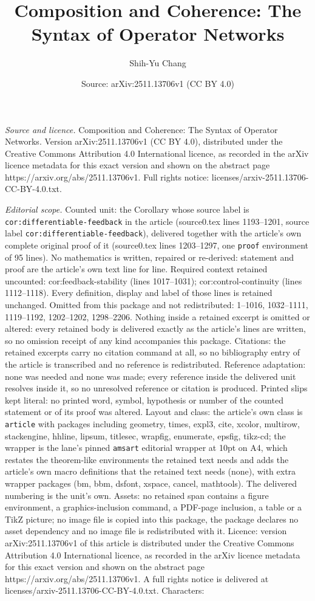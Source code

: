 \documentclass[10pt,a4paper]{amsart}
\title[Composition and Coherence: The Syntax of Operator Networks]{Composition and Coherence: The Syntax of Operator Networks}
\author{Shih-Yu Chang}
\date{Source: arXiv:2511.13706v1 (CC BY 4.0)}
\begin{document}
\maketitle

\noindent\emph{Source and licence.} Composition and Coherence: The Syntax of Operator Networks. Version arXiv:2511.13706v1 (CC BY 4.0), distributed under the Creative Commons Attribution 4.0 International licence, as recorded in the arXiv licence metadata for this exact version and shown on the abstract page https://arxiv.org/abs/2511.13706v1. Full rights notice: licenses/arxiv-2511.13706-CC-BY-4.0.txt.\par\smallskip

\noindent\textit{Editorial scope.} Counted unit: the Corollary whose source label is \texttt{cor:differentiable-feedback} in the article (source0.tex lines 1193--1201, source label \texttt{cor:differentiable-feedback}), delivered together with the article's own complete original proof of it (source0.tex lines 1203--1297, one \texttt{proof} environment of 95 lines). No mathematics is written, repaired or re-derived: statement and proof are the article's own text line for line. Required context retained uncounted: cor:feedback-stability (lines 1017--1031); cor:control-continuity (lines 1112--1118). Every definition, display and label of those lines is retained unchanged. Omitted from this package and not redistributed: 1--1016, 1032--1111, 1119--1192, 1202--1202, 1298--2206. Nothing inside a retained excerpt is omitted or altered: every retained body is delivered exactly as the article's lines are written, so no omission receipt of any kind accompanies this package. Citations: the retained excerpts carry no citation command at all, so no bibliography entry of the article is transcribed and no reference is redistributed. Reference adaptation: none was needed and none was made; every reference inside the delivered unit resolves inside it, so no unresolved reference or citation is produced. Printed slips kept literal: no printed word, symbol, hypothesis or number of the counted statement or of its proof was altered. Layout and class: the article's own class is \texttt{article} with packages including geometry, times, expl3, cite, xcolor, multirow, stackengine, hhline, lipsum, titlesec, wrapfig, enumerate, epsfig, tikz-cd; the wrapper is the lane's pinned \texttt{amsart} editorial wrapper at 10pt on A4, which restates the theorem-like environments the retained text needs and adds the article's own macro definitions that the retained text needs (none), with extra wrapper packages (bm, bbm, dsfont, xspace, cancel, mathtools). The delivered numbering is the unit's own. Assets: no retained span contains a figure environment, a graphics-inclusion command, a PDF-page inclusion, a table or a TikZ picture; no image file is copied into this package, the package declares no asset dependency and no image file is redistributed with it. Licence: version arXiv:2511.13706v1 of this article is distributed under the Creative Commons Attribution 4.0 International licence, as recorded in the arXiv licence metadata for this exact version and shown on the abstract page https://arxiv.org/abs/2511.13706v1. A full rights notice is delivered at licenses/arxiv-2511.13706-CC-BY-4.0.txt. Characters: 
\end{document}
